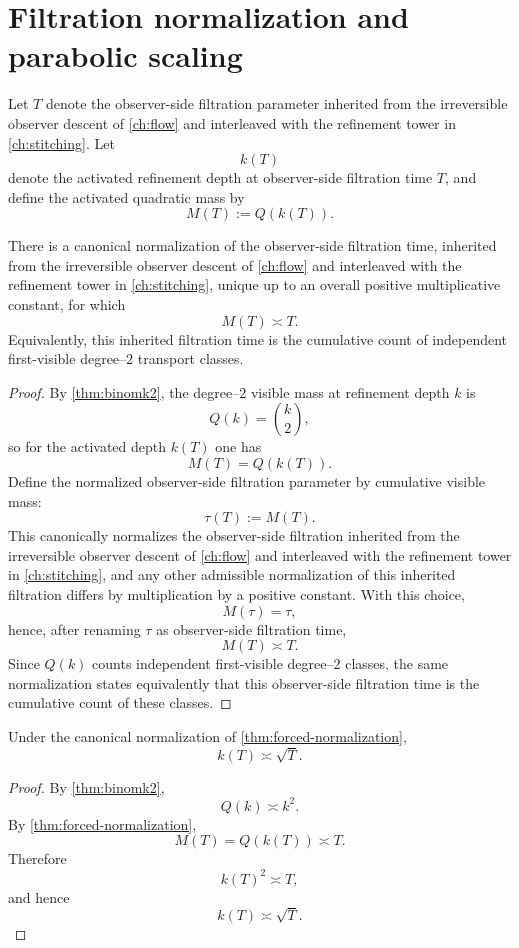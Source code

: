 \section{Filtration normalization and parabolic scaling}
\label{sec:parabolic}
Let \(T\) denote the observer-side filtration parameter inherited
from the irreversible observer descent of \cref{ch:flow} and
interleaved with the refinement tower in \cref{ch:stitching}. Let
\[
	k(T)
\]
denote the activated refinement depth at observer-side filtration
time \(T\), and define the activated quadratic mass by
\[
	M(T):=Q(k(T)).
\]
\begin{theorem}
	\label{thm:forced-normalization}
	There is a canonical normalization of the observer-side filtration
	time, inherited from the irreversible observer descent of
	\cref{ch:flow} and interleaved with the refinement tower in
	\cref{ch:stitching}, unique up to an overall positive
	multiplicative constant, for which
	\[
		M(T)\asymp T.
	\]
	Equivalently, this inherited filtration time is the cumulative count
	of independent first-visible degree--\(2\) transport classes.
\end{theorem}
\begin{proof}
	By \cref{thm:binomk2}, the degree--\(2\) visible mass at refinement
	depth \(k\) is
	\[
		Q(k)=\binom{k}{2},
	\]
	so for the activated depth \(k(T)\) one has
	\[
		M(T)=Q(k(T)).
	\]
	Define the normalized observer-side filtration parameter by
	cumulative visible mass:
	\[
		\tau(T):=M(T).
	\]
	This canonically normalizes the observer-side filtration inherited
	from the irreversible observer descent of \cref{ch:flow} and
	interleaved with the refinement tower in \cref{ch:stitching}, and
	any other admissible normalization of this inherited filtration
	differs by multiplication by a positive constant.
	With this choice,
	\[
		M(\tau)=\tau,
	\]
	hence, after renaming \(\tau\) as observer-side filtration time,
	\[
		M(T)\asymp T.
	\]
	Since \(Q(k)\) counts independent first-visible degree--\(2\)
	classes, the same normalization states equivalently that this
	observer-side filtration time is the cumulative count of these
	classes.
\end{proof}
\begin{lemma}
	\label{lem:parabolic}
	Under the canonical normalization of \cref{thm:forced-normalization},
	\[
		k(T)\asymp \sqrt T.
	\]
\end{lemma}
\begin{proof}
	By \cref{thm:binomk2},
	\[
		Q(k)\asymp k^2.
	\]
	By \cref{thm:forced-normalization},
	\[
		M(T)=Q(k(T))\asymp T.
	\]
	Therefore
	\[
		k(T)^2\asymp T,
	\]
	and hence
	\[
		k(T)\asymp \sqrt T.
	\]
\end{proof}
